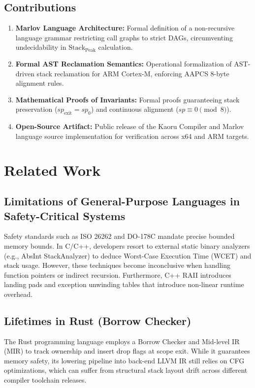 \documentclass[conference]{IEEEtran}
\begin{document}
\subsection{Contributions}
\begin{enumerate}
    \item \textbf{Marlov Language Architecture:} Formal definition of a non-recursive language grammar restricting call graphs to strict DAGs, circumventing undecidability in $\mathrm{Stack}_{\mathrm{Peak}}$ calculation.
    \item \textbf{Formal AST Reclamation Semantics:} Operational formalization of AST-driven stack reclamation for ARM Cortex-M, enforcing AAPCS 8-byte alignment rules.
    \item \textbf{Mathematical Proofs of Invariants:} Formal proofs guaranteeing stack preservation ($sp_{\text{exit}} = sp_0$) and continuous alignment ($sp \equiv 0 \pmod 8$).
    \item \textbf{Open-Source Artifact:} Public release of the Kaoru Compiler and Marlov language source implementation for verification across x64 and ARM targets.
\end{enumerate}

\section{Related Work}

\subsection{Limitations of General-Purpose Languages in Safety-Critical Systems}
Safety standards such as ISO 26262 and DO-178C mandate precise bounded memory bounds. In C/C++, developers resort to external static binary analyzers (e.g., AbsInt StackAnalyzer) to deduce Worst-Case Execution Time (WCET) and stack usage. However, these techniques become inconclusive when handling function pointers or indirect recursion. Furthermore, C++ RAII introduces landing pads and exception unwinding tables that introduce non-linear runtime overhead.

\subsection{Lifetimes in Rust (Borrow Checker)}
The Rust programming language employs a Borrow Checker and Mid-level IR (MIR) to track ownership and insert drop flags at scope exit. While it guarantees memory safety, its lowering pipeline into back-end LLVM IR still relies on CFG optimizations, which can suffer from structural stack layout drift across different compiler toolchain releases.
\end{document}
